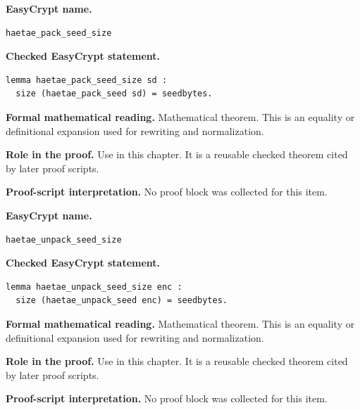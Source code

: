 \begin{formaltheorem}
\noindent\textbf{EasyCrypt name.}
\begin{lstlisting}[language=EasyCrypt,basicstyle=\ttfamily\scriptsize]
haetae_pack_seed_size
\end{lstlisting}
\noindent\textbf{Checked EasyCrypt statement.}
\begin{lstlisting}[language=EasyCrypt,basicstyle=\ttfamily\scriptsize]
lemma haetae_pack_seed_size sd :
  size (haetae_pack_seed sd) = seedbytes.
\end{lstlisting}
\noindent\textbf{Formal mathematical reading.}
Mathematical theorem. This is an equality or definitional expansion used for rewriting and normalization.

\noindent\textbf{Role in the proof.}
Use in this chapter. It is a reusable checked theorem cited by later proof scripts.

\noindent\textbf{Proof-script interpretation.}
No proof block was collected for this item.

\end{formaltheorem}

\begin{formaltheorem}
\noindent\textbf{EasyCrypt name.}
\begin{lstlisting}[language=EasyCrypt,basicstyle=\ttfamily\scriptsize]
haetae_unpack_seed_size
\end{lstlisting}
\noindent\textbf{Checked EasyCrypt statement.}
\begin{lstlisting}[language=EasyCrypt,basicstyle=\ttfamily\scriptsize]
lemma haetae_unpack_seed_size enc :
  size (haetae_unpack_seed enc) = seedbytes.
\end{lstlisting}
\noindent\textbf{Formal mathematical reading.}
Mathematical theorem. This is an equality or definitional expansion used for rewriting and normalization.

\noindent\textbf{Role in the proof.}
Use in this chapter. It is a reusable checked theorem cited by later proof scripts.

\noindent\textbf{Proof-script interpretation.}
No proof block was collected for this item.

\end{formaltheorem}

